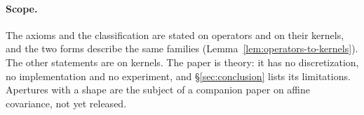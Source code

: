 \paragraph{Scope.} The axioms and the classification are stated on operators and on their kernels,
and the two forms describe the same families (Lemma~\ref{lem:operators-to-kernels}). The other
statements are on kernels. The paper is theory: it has no
discretization, no implementation and no experiment, and \S\ref{sec:conclusion} lists its
limitations. Apertures with a shape are the subject of
a companion paper on affine covariance, not yet released.


